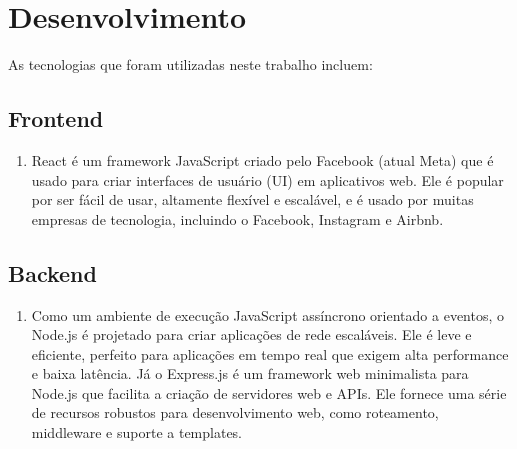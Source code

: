\chapter{Desenvolvimento}
    As tecnologias que foram utilizadas neste trabalho incluem:
\section{Frontend}
\begin{enumerate}
    \subsection{React.js}
    \item React é um framework JavaScript criado pelo Facebook (atual Meta) que é usado para criar interfaces de usuário (UI) em aplicativos web.
    Ele é popular por ser fácil de usar, altamente flexível e escalável, e é usado por muitas empresas de tecnologia, incluindo o Facebook, Instagram e Airbnb.
\end{enumerate}

\section{Backend}
\begin{enumerate}
    \subsection{Node JS e Express}
    \item Como um ambiente de execução JavaScript assíncrono orientado a eventos, 
    o Node.js é projetado para criar aplicações de rede escaláveis. Ele é leve e eficiente, 
    perfeito para aplicações em tempo real que exigem alta performance e baixa latência.
    Já o Express.js é um framework web minimalista para Node.js que facilita a criação de servidores web e APIs.
    Ele fornece uma série de recursos robustos para desenvolvimento web, como roteamento, middleware e suporte a templates.
\end{enumerate}

\label{Desenvolvimento}
